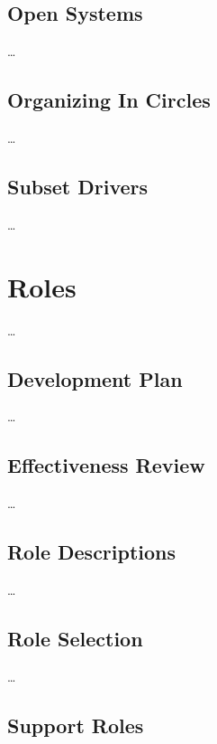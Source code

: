 \section{Open Systems}
\label{opensystems}

{\ldots}

\section{Organizing In Circles}
\label{organizingincircles}

{\ldots}

\section{Subset Drivers}
\label{subsetdrivers}

{\ldots}

\chapter{Roles}
\label{roles}

{\ldots}

\section{Development Plan}
\label{developmentplan}

{\ldots}

\section{Effectiveness Review}
\label{effectivenessreview}

{\ldots}

\section{Role Descriptions}
\label{roledescriptions}

{\ldots}

\section{Role Selection}
\label{roleselection}

{\ldots}

\section{Support Roles}
\label{supportroles}

